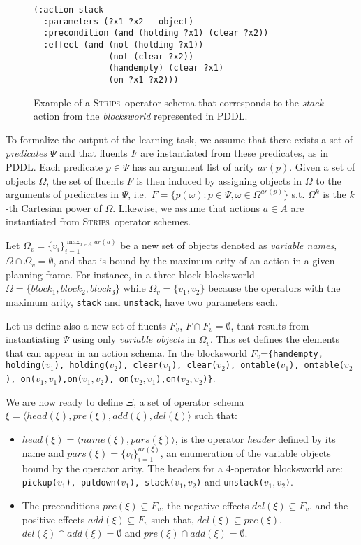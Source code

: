\documentclass[letterpaper]{article} %
\newcommand{\tup}[1]{{\langle #1 \rangle}}
\newcommand{\strips}{\textsc{Strips}}     %
\begin{document}
\begin{figure}
\begin{footnotesize}
\begin{verbatim}
(:action stack
  :parameters (?x1 ?x2 - object)
  :precondition (and (holding ?x1) (clear ?x2))
  :effect (and (not (holding ?x1))
               (not (clear ?x2))
               (handempty) (clear ?x1)
               (on ?x1 ?x2)))
\end{verbatim}
\end{footnotesize}
 \caption{\small Example of a \strips\ operator schema that corresponds to the {\em stack} action from the {\em blocksworld} represented in PDDL.}
\label{fig:stack}
\end{figure}

To formalize the output of the learning task, we assume that there exists a set of {\em predicates} $\Psi$ and that fluents $F$ are instantiated from these predicates, as in PDDL. Each predicate $p\in\Psi$ has an argument list of arity $ar(p)$. Given a set of objects $\Omega$, the set of fluents $F$ is then induced by assigning objects in $\Omega$ to the arguments of predicates in $\Psi$, i.e.~$F=\{p(\omega):p\in\Psi,\omega\in\Omega^{ar(p)}\}$ s.t. $\Omega^k$ is the $k$-th Cartesian power of $\Omega$. Likewise, we assume that actions $a\in A$ are instantiated from \strips\ operator schemes.

Let $\Omega_v=\{v_i\}_{i=1}^{\operatorname*{max}_{a\in A} ar(a)}$ be a new set of objects denoted as {\em variable names}, $\Omega\cap\Omega_v=\emptyset$, and that is bound by the maximum arity of an action in a given planning frame. For instance, in a three-block blocksworld $\Omega=\{block_1, block_2, block_3\}$ while $\Omega_v=\{v_1, v_2\}$ because the operators with the maximum arity, {\small\tt stack} and {\small\tt unstack}, have two parameters each.

Let us define also a new set of fluents $F_{v}$, $F\cap F_v=\emptyset$, that results from instantiating $\Psi$ using only {\em variable objects} in $\Omega_v$. This set defines the elements that can appear in an action schema. In the blocksworld $F_v$={\small\tt\{handempty, holding($v_1$), holding($v_2$), clear($v_1$), clear($v_2$), ontable($v_1$), ontable($v_2$), on($v_1,v_1$),on($v_1,v_2$), on($v_2,v_1$),on($v_2,v_2$)\}}.

We are now ready to define $\Xi$, a set of operator schema $\xi=\tup{head(\xi),pre(\xi),add(\xi),del(\xi)}$ such that:
\begin{itemize}
\item $head(\xi)=\tup{name(\xi),pars(\xi)}$, is the operator {\em header} defined by its name and $pars(\xi)=\{v_i\}_{i=1}^{ar(\xi)}$, an enumeration of the variable objects bound by the operator arity. The headers for a 4-operator blocksworld are: {\small\tt pickup($v_1$), putdown($v_1$), stack($v_1,v_2$)} and {\small\tt unstack($v_1,v_2$)}.
\item The preconditions $pre(\xi)\subseteq F_v$, the negative effects $del(\xi)\subseteq F_v$, and the positive effects $add(\xi)\subseteq F_v$ such that, $del(\xi)\subseteq pre(\xi)$, $del(\xi)\cap add(\xi)=\emptyset$ and $pre(\xi)\cap add(\xi)=\emptyset$.
\end{itemize}
\end{document}
